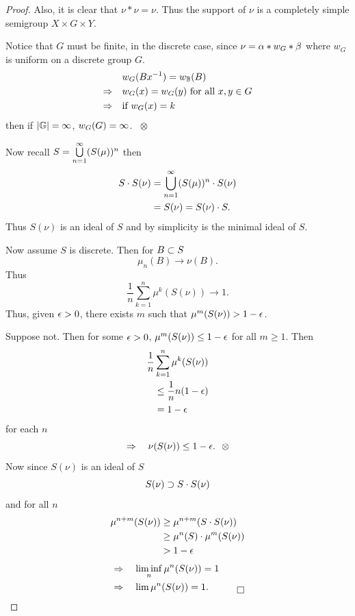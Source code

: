 \begin{proof}
Also, it is clear that $\nu * \nu = \nu$.  
Thus the support of $\nu$ is a completely simple semigroup $X \times G \times Y$.

Notice that $G$ must be finite, in the discrete case, since $\nu = \alpha * w_G * \beta$ where $w_G$ is uniform on a discrete group $G$.
\[
\begin{aligned}
       &w_G(Bx^{-1}) = w_{\mathbb{B}}(B)                     \\
     \Rightarrow \quad &w_G(x) = w_G(y) \hbox{ for all }
          x,y \in G                                \\
     \Rightarrow \quad &\hbox{if } w_G(x) = k
\end{aligned}
\]
then if $|\mathbb{G}| = \infty$, $w_G(G) = \infty$.  \ $\otimes$

Now recall $S = \bigcup\limits^\infty_{n=1} (S(\mu))^n$ then
\[
\begin{aligned}
       S \cdot S(\nu) &= \bigcup^\infty_{n=1} (S(\mu))^n
               \cdot S(\nu)                                    \\
       &= S(\nu) = S(\nu) \cdot S.
\end{aligned}
\]
Thus $S(\nu)$ is an ideal of $S$ and by simplicity is the minimal
ideal of $S$.

Now assume $S$ is discrete.  
Then for $B \subset S$
\[
     \mu_n(B) \to \nu(B).
\]
Thus
\[
     \frac{1}{n} \sum^n_{k=1} \mu^k(S(\nu)) \to 1.
\]
Thus, given $\epsilon > 0$, there exists $m$ such that $\mu^m(S(\nu)) > 1-\epsilon$.

Suppose not.  
Then for some $\epsilon > 0$, $\mu^m(S(\nu)) \le 1 - \epsilon$ for all $m \ge 1$.  Then
\[
\begin{aligned}
       \frac{1}{n} &\sum^n_{k=1} \mu^k(S(\nu))     \\
       &\le \frac{1}{n} n(1-\epsilon)                    \\
       &= 1-\epsilon
\end{aligned}
\]
for each $n$
\[
     \Rightarrow \quad \nu(S(\nu)) \le 1-\e. \ \ \otimes
\]
Now since $S(\nu)$ is an ideal of $S$
\[
     S(\nu) \supset S \cdot S(\nu)
\]
and for all $n$
\[
\begin{aligned}
       \mu^{n+m}(S(\nu)) &\ge \mu^{n+m}(S \cdot S(\nu))        \\
       &\ge \mu^n(S) \cdot \mu^m(S(\nu))                       \\
       &> 1-\epsilon
\end{aligned}
\]
\[
\begin{aligned}
       &\Rightarrow \quad \liminf_n \mu^n (S(\nu)) = 1     \\
       &\Rightarrow \quad \lim \mu^n (S(\nu)) = 1. \quad \qed
\end{aligned}
\]
\end{proof}


